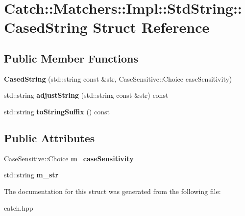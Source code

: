 \hypertarget{structCatch_1_1Matchers_1_1Impl_1_1StdString_1_1CasedString}{}\section{Catch\+:\+:Matchers\+:\+:Impl\+:\+:Std\+String\+:\+:Cased\+String Struct Reference}
\label{structCatch_1_1Matchers_1_1Impl_1_1StdString_1_1CasedString}
\subsection*{Public Member Functions}
\begin{DoxyCompactItemize}
\item 
{\bfseries Cased\+String} (std\+::string const \&str, Case\+Sensitive\+::\+Choice case\+Sensitivity)\hypertarget{structCatch_1_1Matchers_1_1Impl_1_1StdString_1_1CasedString_aebd017c88423d8a11c62cff85754a22d}{}\label{structCatch_1_1Matchers_1_1Impl_1_1StdString_1_1CasedString_aebd017c88423d8a11c62cff85754a22d}

\item 
std\+::string {\bfseries adjust\+String} (std\+::string const \&str) const \hypertarget{structCatch_1_1Matchers_1_1Impl_1_1StdString_1_1CasedString_aaf5c4be8b3b8b317777d0e332d3733b5}{}\label{structCatch_1_1Matchers_1_1Impl_1_1StdString_1_1CasedString_aaf5c4be8b3b8b317777d0e332d3733b5}

\item 
std\+::string {\bfseries to\+String\+Suffix} () const \hypertarget{structCatch_1_1Matchers_1_1Impl_1_1StdString_1_1CasedString_ae5865fa1dd20c80498a094cae5459883}{}\label{structCatch_1_1Matchers_1_1Impl_1_1StdString_1_1CasedString_ae5865fa1dd20c80498a094cae5459883}

\end{DoxyCompactItemize}
\subsection*{Public Attributes}
\begin{DoxyCompactItemize}
\item 
Case\+Sensitive\+::\+Choice {\bfseries m\+\_\+case\+Sensitivity}\hypertarget{structCatch_1_1Matchers_1_1Impl_1_1StdString_1_1CasedString_af399ed93051d8981e298206dee6898b3}{}\label{structCatch_1_1Matchers_1_1Impl_1_1StdString_1_1CasedString_af399ed93051d8981e298206dee6898b3}

\item 
std\+::string {\bfseries m\+\_\+str}\hypertarget{structCatch_1_1Matchers_1_1Impl_1_1StdString_1_1CasedString_a9f8ce063a934330ac59bf8638f047e99}{}\label{structCatch_1_1Matchers_1_1Impl_1_1StdString_1_1CasedString_a9f8ce063a934330ac59bf8638f047e99}

\end{DoxyCompactItemize}


The documentation for this struct was generated from the following file\+:\begin{DoxyCompactItemize}
\item 
catch.\+hpp\end{DoxyCompactItemize}
